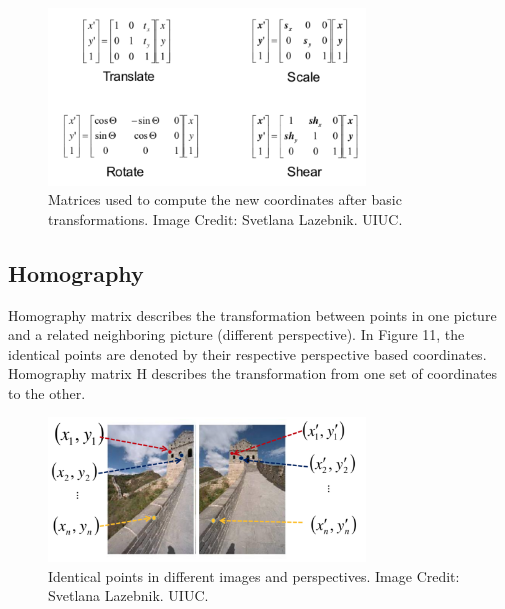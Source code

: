 \documentclass{article}
\begin{document}
\begin{figure}[h]
  \centering
  \includegraphics[width=0.75\textwidth]{transMatrices.png}
  \caption{Matrices used to compute the new coordinates after basic transformations. Image Credit: Svetlana Lazebnik. UIUC.}
\end{figure}

\subsection{Homography}

Homography matrix describes the transformation between points in one picture and a related neighboring picture (different perspective). In Figure 11, the identical points are denoted by their respective perspective based coordinates. Homography matrix H describes the transformation from one set of coordinates to the other.

\begin{figure}[h]
  \centering
  \includegraphics[width=0.75\textwidth]{homography_prob.png}
  \caption{Identical points in different images and perspectives. Image Credit: Svetlana Lazebnik. UIUC.}
\end{figure}
\end{document}
